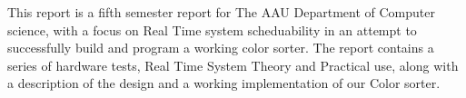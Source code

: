 This report is a fifth semester report for The AAU Department of Computer science, with a focus on Real Time system scheduability in an attempt to successfully build and program a working color sorter.
The report contains a series of hardware tests, Real Time System Theory and Practical use, along with a description of the design and a working implementation of our Color sorter.



